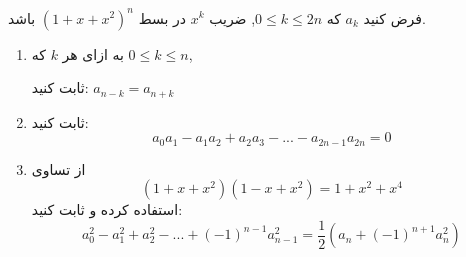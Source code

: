     \p
    فرض کنید 
	$a_k$
	كه
	$0 \leq k \leq 2n$,
	 ضریب 
	 $x^k$ در بسط $(1 + x + x^2)^n$ باشد.
	\begin{enumerate}
        \item
    	به ازای هر $k$
		كه
		$0 \leq k \leq n$,
		 
        ثابت کنید: $a_{n-k} = a_{n+k}$
    	\item
    	ثابت کنید:
        $$a_0a_1 - a_1a_2 + a_2a_3 - ... - a_{2n-1}a_{2n} = 0$$
    	\item
    	از تساوی
    	$$(1 + x + x^2)(1 - x + x^2) = 1 + x^2 + x^4$$
    	استفاده کرده و ثابت کنید:
    	$$a_0^2 - a_1^2 + a_2^2 - ... + (-1)^{n - 1}a_{n - 1}^2 = \frac{1}{2}(a_n + (-1)^{n + 1}a_n^2)$$
    	
	\end{enumerate}
